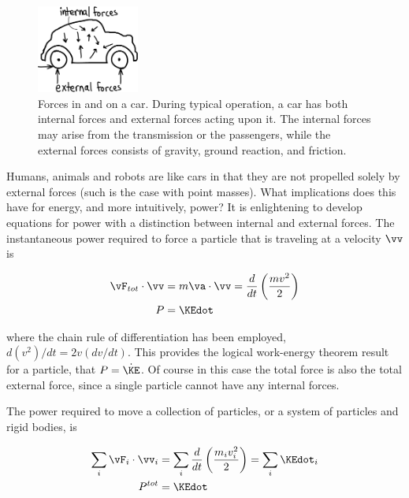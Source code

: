 \begin{figure}[h]		%
\begin{centering}
\includegraphics[width=0.3\textwidth]{Figures/CarForces}\par
\end{centering}
\caption[Diagram: Forces in and on a car]{Forces in and on a car. During typical operation, a car has both internal forces and external forces acting upon it. The internal forces may arise from the transmission or the passengers, while the external forces consists of gravity, ground reaction, and friction.}
\label{fig:CarForces}
\end{figure}
%

Humans, animals and robots are like cars in that they are not propelled solely by external forces (such is the case with point masses). What implications does this have for energy, and more intuitively, power? It is enlightening to develop equations for power with a distinction between internal and external forces. The instantaneous power required to force a particle that is traveling at a velocity $\vv$ is

\begin{align}
\vF_{tot} \cdot \vv  &=  m\va \cdot \vv = \frac{d}{dt} \left(\frac{m v^2}{2}\right) \\
 P &= \KEdot
\end{align}

where the chain rule of differentiation has been employed, $d(v^{2})/dt = 2v(dv/dt)$. This provides the logical work-energy theorem result for a particle, that $P = \dot{\KE}$. Of course in this case the total force is also the total external force, since a single particle cannot have any internal forces.

The power required to move a collection of particles, or a system of particles and rigid bodies, is

\begin{align}
 \sum_{i} \vF_{i} \cdot \vv_{i}  &=  \sum_{i} \frac{d}{dt}\left(\frac{m_{i} v_{i}^{2}}{2}\right) = \sum_{i} \KEdot_{i}\\
P^{tot} &= \KEdot
\label{eq:PowerCollectionOfParticles}
\end{align}

